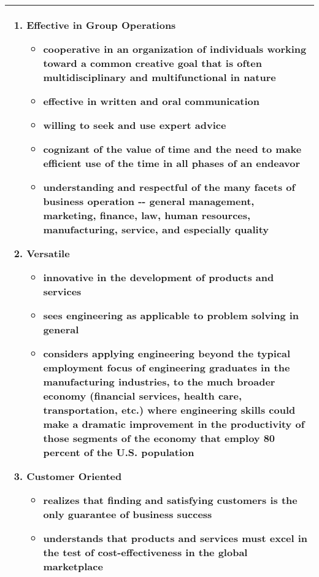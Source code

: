 \begin{longtable}[c]{|m{14cm}|}
\begin{enumerate}
\item Effective in Group Operations
\begin{itemize}
\itemsep0em 
\item  cooperative in an organization of individuals working toward a common
  creative goal that is often multidisciplinary and multifunctional in
  nature
\item  effective in written and oral communication
\item   willing to seek and use expert advice
\item  cognizant of the value of time and the need to make efficient use of
  the time in all phases of an endeavor
\item   understanding and respectful of the many facets of business operation
  -\/- general management, marketing, finance, law, human resources,
  manufacturing, service, and especially quality
\end{itemize}

\item Versatile
\begin{itemize}
\itemsep0em 
\item  innovative in the development of products and services
\item  sees engineering as applicable to problem solving in general
\item  considers applying engineering beyond the typical employment focus of
  engineering graduates in the manufacturing industries, to the much
  broader economy (financial services, health care, transportation,
  etc.) where engineering skills could make a dramatic improvement in
  the productivity of those segments of the economy that employ 80
  percent of the U.S. population
\end{itemize}

\item Customer Oriented 
\begin{itemize}
\itemsep0em 
\item  realizes that finding and satisfying customers is the only guarantee
  of business success
\item  understands that products and services must excel in the test of
  cost-effectiveness in the global marketplace
\end{itemize}
\end{enumerate}
\\ \hline
\end{longtable}
\normalsize





